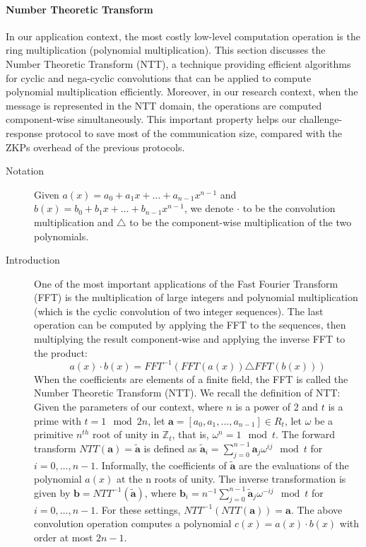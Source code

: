 \paragraph{Number Theoretic Transform}
In our application context, the most costly low-level computation operation is
the ring multiplication (polynomial multiplication). This section discusses the
Number Theoretic Transform (NTT), a technique providing efficient algorithms
for cyclic and nega-cyclic convolutions that can be applied to compute
polynomial multiplication efficiently. Moreover, in our research context, when
the message is represented in the NTT domain, the operations are computed
component-wise simultaneously. This important property helps our
challenge-response protocol to save most of the communication size, compared with the
ZKPs overhead of the previous protocols.
\begin{description}
\item[Notation] Given \(a(x) = a_{0} + a_{1}x + \dots + a_{n-1}x^{n-1}\) and
  \(b(x) = b_{0} + b_{1}x + \dots + b_{n-1}x^{n-1}\), we denote \(\cdot\) to be
  the convolution multiplication and \(\triangle\) to be the component-wise
  multiplication of the two polynomials.
\item[Introduction] One of the most important applications of the Fast Fourier
  Transform (FFT) is the multiplication of large integers and polynomial
  multiplication (which is the cyclic convolution of two integer sequences). The
  last operation can be computed by applying the FFT to the sequences, then
  multiplying the result component-wise and applying the inverse FFT to the
  product:
  \[
    a(x)\cdot b(x) = FFT^{-1}(FFT(a(x)) \triangle FFT(b(x)))
  \]
When the coefficients are elements of a finite field, the FFT is called the
  Number Theoretic Transform (NTT). We recall the definition of NTT: Given the
  parameters of our context, where \(n\) is a power of 2 and \(t\) is a prime
  with \(t = 1 \mod 2n\), let
  \(\mathbf{a} = [a_{0}, a_{1}, \dots, a_{n-1}] \in R_{t}\), let \(\omega\)
  be a primitive \(n^{th}\) root of unity in \(\mathbb{Z}_{t}\), that is,
  \(\omega^{n} = 1 \mod t\). The forward transform
  \(NTT(\mathbf{a}) = \tilde{\mathbf{a}}\) is defined as
  \(\tilde{\mathbf{a}}_{i} = \sum_{j=0}^{n-1}{\mathbf{a}_{j}}\omega^{ij} \mod
  t\) for \(i = 0, \dots, n -1\). Informally, the coefficients of
  \(\tilde{\mathbf{a}}\) are the evaluations of the polynomial \(a(x)\) at the n
  roots of unity. The inverse transformation is given by
  \(\mathbf{b} = NTT^{-1}(\tilde{\mathbf{a}})\), where
  \(\mathbf{b}_{i} = n^{-1}\sum_{j=0}^{n-1}\tilde{\mathbf{a}}_{j}\omega^{-ij}
  \mod t \) for \(i = 0, \dots, n - 1\). For these settings,
  \(NTT^{-1}(NTT(\mathbf{a})) = \mathbf{a}\).  The above convolution operation
  computes a polynomial \(c(x) = a(x)\cdot b(x)\) with order at most \(2n - 1\).
  

\end{description}
